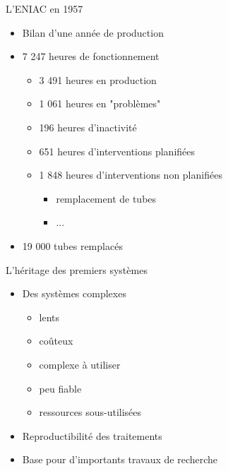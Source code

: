 \begin{frame}{L’ENIAC en 1957}
\begin{itemize}
\item Bilan d'une année de production
\item 7 247 heures de fonctionnement
\begin{itemize}
\item 3 491 heures en production
\item 1 061 heures en "problèmes"
\item 196 heures d’inactivité
\item 651 heures d’interventions planifiées
\item 1 848 heures d’interventions non planifiées
\begin{itemize}
\item remplacement de tubes
\item ...
\end{itemize}
\end{itemize}
\item 19 000 tubes remplacés
\end{itemize}
\end{frame}



\begin{frame}{L'héritage des premiers systèmes}
\begin{itemize}
\item Des systèmes complexes
\begin{itemize}
\item lents
\item coûteux
\item complexe à utiliser
\item peu fiable
\item ressources sous-utilisées
\end{itemize}
\item Reproductibilité des traitements
\item Base pour d'importants travaux de recherche
\end{itemize}
\end{frame}


